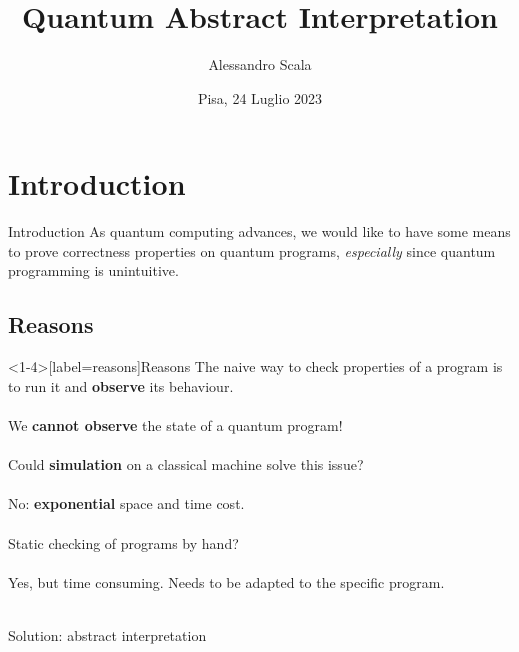 \documentclass[11pt,svgnames,smaller,aspectratio=43,english]{beamer}
\title{Quantum Abstract Interpretation}
\author{Alessandro Scala}
\institute[Università di Pisa]{Università di Pisa\\Dipartimento di Informatica}
\date{Pisa, 24 Luglio 2023}
\begin{document}
\begin{frame} 
	\titlepage
\end{frame}





\section{Introduction}
\begin{frame}{Introduction}
	As quantum computing advances, we would like to have some means to prove correctness properties on quantum programs, \emph{especially} since quantum programming is unintuitive.\\
\end{frame}

\subsection{Reasons}
\begin{frame}<1-4>[label=reasons]{Reasons}
	The naive way to check properties of a program is to run it and \textbf<2->{observe} its behaviour.\\\;\\
	\pause
	\alert{We \textbf{cannot observe} the state of a quantum program!}\\\;\\
	\pause
	Could \textbf{simulation} on a classical machine solve this issue?\\\;\\
	\pause
	\alert{No: \textbf{exponential} space and time cost.}\\\;\\
	\pause
	Static checking of programs by hand?\\\;\\
	\pause
	{\color{orange} Yes, but time consuming. Needs to be adapted to the specific program.}\\\;\\
	\pause
	\begin{center}
		\large \color{blue} Solution: abstract interpretation
	\end{center}
\end{frame}
\end{document}
